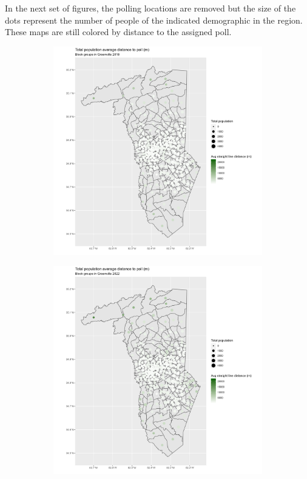 \documentclass[11pt]{article}
\theoremstyle{remark}
\theoremstyle{definition}
\begin{document}
In the next set of figures, the polling locations are removed but the size of the dots represent the number of people of the indicated demographic in the region. These maps are still colored by distance to the assigned poll.

\begin{figure}
	\begin{subfigure}{.5\textwidth}
		\centering
		\includegraphics[width=\linewidth]{result analysis/Greenville_SC_original_configs/population_pop_and_dist_Greenville_config_original_2018_polls.png}
		\label{sfig:York_2018_bg_dist_pop}
	\end{subfigure} 
	\begin{subfigure}{.5\textwidth}
		\centering
		\includegraphics[width=\linewidth]{result analysis/Greenville_SC_original_configs/population_pop_and_dist_Greenville_config_original_2022_polls.png}

\end{subfigure}
\end{figure}
\end{document}
